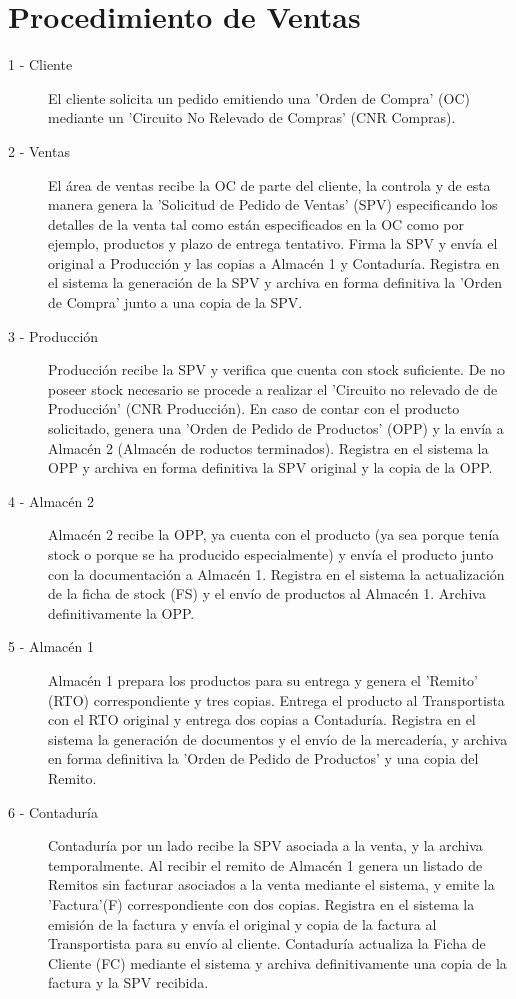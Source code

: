 \section{Procedimiento de Ventas}
 \begin{description}
	\item[1 - Cliente] El cliente solicita un pedido emitiendo una 'Orden de Compra' (OC) mediante un 'Circuito No Relevado de Compras' (CNR Compras).
	\item[2 - Ventas] El \'area de ventas recibe la OC de parte del cliente, la controla y de esta manera genera la 'Solicitud de Pedido de Ventas' (SPV) especificando los detalles de la venta tal como est\'an especificados en la OC como por ejemplo, productos y plazo de entrega tentativo. Firma la SPV y env\'ia el original a Producci\'on y las copias a Almac\'en 1 y Contadur\'ia. Registra en el sistema la generaci\'on de la SPV y archiva en forma definitiva la 'Orden de Compra' junto a una copia de la SPV.
	\item[3 - Producci\'on] Producci\'on recibe la SPV y verifica que cuenta con stock suficiente. De no poseer stock necesario se procede a realizar el 'Circuito no relevado de de Producci\'on' (CNR Producci\'on). En caso de contar con el producto solicitado, genera una 'Orden de Pedido de Productos' (OPP) y la env\'ia a Almac\'en 2 (Almac\'en de roductos terminados).  Registra en el sistema la OPP y archiva en forma definitiva la SPV original y la copia de la OPP. 
	\item[4 - Almac\'en 2] Almac\'en 2 recibe la OPP, ya cuenta con el producto (ya sea porque ten\'ia stock o porque se ha producido especialmente) y env\'ia el producto junto con la documentaci\'on a Almac\'en 1. Registra en el sistema la actualización de la ficha de stock (FS) y el envío de productos al Almac\'en 1. Archiva definitivamente la OPP.
	\item[5 - Almac\'en 1] Almac\'en 1 prepara los productos para su entrega y genera el 'Remito' (RTO) correspondiente y tres copias. Entrega el producto al Transportista con el RTO original y entrega dos copias a Contadur\'ia. Registra en el sistema la generación de documentos y el env\'io de la mercader\'ia, y archiva en forma definitiva la 'Orden de Pedido de Productos' y una copia del Remito.
	\item[6 - Contadur\'ia] Contadur\'ia por un lado recibe la SPV asociada a la venta, y la archiva temporalmente. Al recibir el remito de Almac\'en 1 genera un listado de Remitos sin facturar asociados a la venta mediante el sistema, y emite la 'Factura'(F) correspondiente con dos copias. Registra en el sistema la emisi\'on de la factura y env\'ia el original y copia de la factura al Transportista para su env\'io al cliente. Contadur\'ia actualiza la Ficha de Cliente (FC) mediante el sistema y archiva definitivamente una copia de la factura y la SPV recibida.

\end{description}
